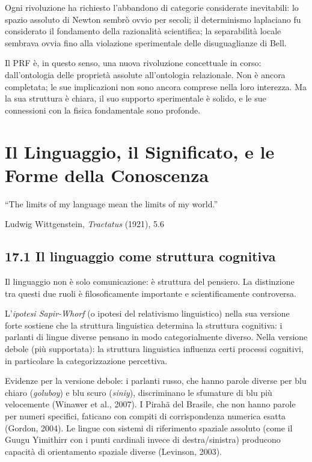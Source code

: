\documentclass[11.5pt,a4paper,openany]{book}
\theoremstyle{remark}
\begin{document}
Ogni rivoluzione ha richiesto l'abbandono di categorie considerate inevitabili: lo spazio assoluto di Newton sembrò ovvio per secoli; il determinismo laplaciano fu considerato il fondamento della razionalità scientifica; la separabilità locale sembrava ovvia fino alla violazione sperimentale delle disuguaglianze di Bell.

Il PRF è, in questo senso, una nuova rivoluzione concettuale in corso: dall'ontologia delle proprietà assolute all'ontologia relazionale. Non è ancora completata; le sue implicazioni non sono ancora comprese nella loro interezza. Ma la sua struttura è chiara, il suo supporto sperimentale è solido, e le sue connessioni con la fisica fondamentale sono profonde.

\chapter{Il Linguaggio, il Significato, e le Forme della Conoscenza}

\epigraph{``The limits of my language mean the limits of my world.''}{Ludwig Wittgenstein, \textit{Tractatus} (1921), 5.6}

\section{17.1 Il linguaggio come struttura cognitiva}

Il linguaggio non è solo comunicazione: è struttura del pensiero. La distinzione tra questi due ruoli è filosoficamente importante e scientificamente controversa.

L'\textit{ipotesi Sapir-Whorf} (o ipotesi del relativismo linguistico) nella sua versione forte sostiene che la struttura linguistica determina la struttura cognitiva: i parlanti di lingue diverse pensano in modo categorialmente diverso. Nella versione debole (più supportata): la struttura linguistica influenza certi processi cognitivi, in particolare la categorizzazione percettiva.

Evidenze per la versione debole: i parlanti russo, che hanno parole diverse per blu chiaro (\textit{goluboy}) e blu scuro (\textit{siniy}), discriminano le sfumature di blu più velocemente (Winawer et al., 2007). I Pirahã del Brasile, che non hanno parole per numeri specifici, faticano con compiti di corrispondenza numerica esatta (Gordon, 2004). Le lingue con sistemi di riferimento spaziale assoluto (come il Guugu Yimithirr con i punti cardinali invece di destra/sinistra) producono capacità di orientamento spaziale diverse (Levinson, 2003).
\end{document}
